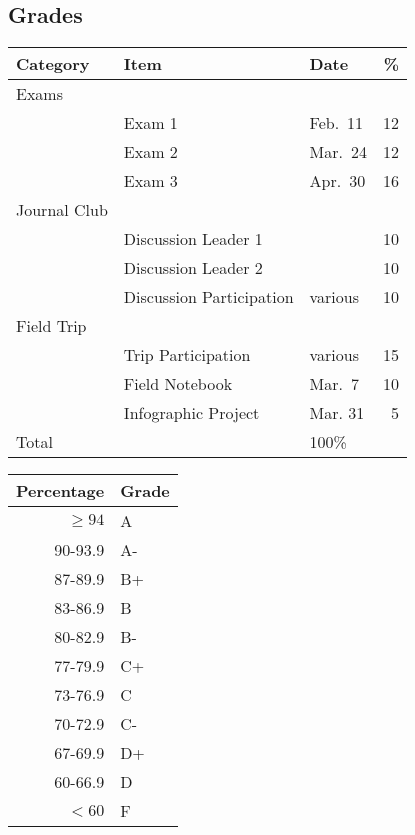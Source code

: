 \documentclass{tufte-handout}
\begin{document}
\subsection{Grades}

\begin{tabular}{l l l r}
Category & Item &  Date &  \%  \\
\hline
Exams \\
& Exam 1 & Feb.\ 11 & 12 \\							
& Exam 2 & Mar.\ 24 & 12 \\							
&  Exam 3 & Apr.\ 30 & 16 \\	
Journal Club \\			
& Discussion Leader 1 &   & 10 \\
& Discussion Leader 2 &   & 10 \\ 
& Discussion Participation & various & 10 \\		
Field Trip \\	
& Trip Participation & various & 15 \\
& Field Notebook & Mar.\ 7 & 10 \\				
& Infographic Project & Mar. 31 & 5 \\
\hline
Total & &   100\%
\end{tabular}


\begin{margintable}
\begin{tabular}{rl}
Percentage & Grade \\
\hline 
$\ge94$ & A \\
90-93.9 & A- \\
87-89.9 & B+ \\
83-86.9 & B \\
80-82.9 & B- \\
77-79.9 & C+ \\
73-76.9 & C \\
70-72.9 & C- \\
67-69.9 & D+ \\
60-66.9 & D \\
$<60$ & F \\
\hline
\end{tabular}
\end{margintable}
\end{document}
